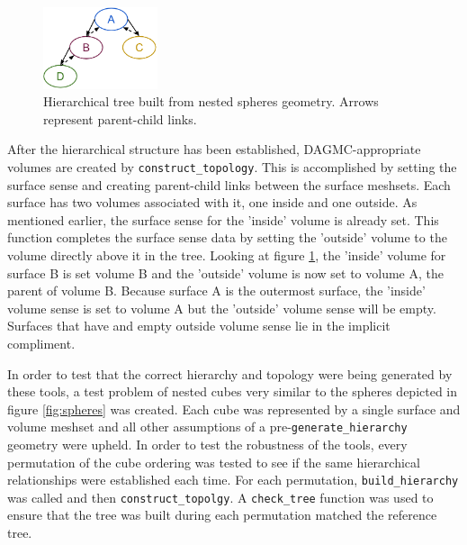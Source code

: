 \documentclass{anstrans}
\begin{document}
\begin{figure}[ht] %
  \centering
  \includegraphics[width=0.3\textwidth]{../figs/tree.png}
  \caption{Hierarchical tree built from nested spheres geometry.  Arrows represent parent-child links.}
  \label{fig:tree}
\end{figure}

After the hierarchical structure has been established, DAGMC-appropriate volumes are created by \texttt{construct\_topology}.
This is accomplished by setting the surface sense and creating parent-child links between the 
surface meshsets.  Each surface has two volumes associated with it, one inside and one outside.  As mentioned earlier,
the surface sense for the 'inside' volume is already set.  This function completes the surface sense data by
setting the 'outside' volume to the volume directly above it in the tree.  Looking at figure \ref{fig:tree},
the 'inside' volume for surface B is set volume B and the 'outside' volume is now set to volume A, 
the parent of volume B.  Because surface A is the outermost surface, 
the 'inside' volume sense is set to volume A but the 'outside' volume sense will be empty.  
Surfaces that have and empty outside volume sense lie in the implicit compliment.

In order to test that the correct hierarchy and topology were being generated by these tools, 
a test problem of nested cubes very similar to the spheres depicted in figure \ref{fig:spheres} was created.
Each cube was represented by a single surface and volume meshset and all other assumptions of a 
pre-\texttt{generate\_hierarchy} geometry were upheld.  In order to test the robustness of the tools,
every permutation of the cube ordering was tested to see if the same hierarchical relationships were
established each time.  For each permutation, \texttt{build\_hierarchy} was called and then
\texttt{construct\_topolgy}.
A \texttt{check\_tree} function was used to ensure that the tree was built during each permutation
matched the reference tree.  

\end{document}
